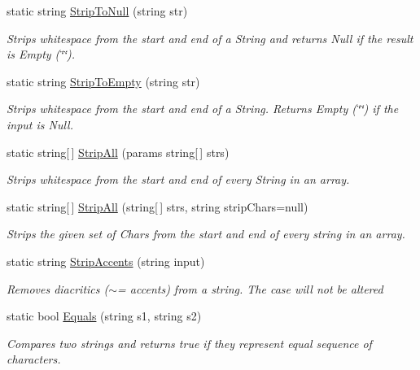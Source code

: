 \begin{DoxyCompactItemize}
static string \hyperlink{class_ultimate_1_1_utilities_1_1_string_utils_a73a525a3fc6b86f8ae1d6fd4c4ffa891}{Strip\+To\+Null} (string str)
\begin{DoxyCompactList}\small\item\em Strips whitespace from the start and end of a String and returns Null if the result is Empty (\char`\"{}\char`\"{}). \end{DoxyCompactList}\item 
static string \hyperlink{class_ultimate_1_1_utilities_1_1_string_utils_ac710f387b0af6a2ca0976705efb8e1b7}{Strip\+To\+Empty} (string str)
\begin{DoxyCompactList}\small\item\em Strips whitespace from the start and end of a String. Returns Empty (\char`\"{}\char`\"{}) if the input is Null. \end{DoxyCompactList}\item 
static string\mbox{[}$\,$\mbox{]} \hyperlink{class_ultimate_1_1_utilities_1_1_string_utils_a5165c2cb4ca636210b9c603ec5249e4d}{Strip\+All} (params string\mbox{[}$\,$\mbox{]} strs)
\begin{DoxyCompactList}\small\item\em Strips whitespace from the start and end of every String in an array. \end{DoxyCompactList}\item 
static string\mbox{[}$\,$\mbox{]} \hyperlink{class_ultimate_1_1_utilities_1_1_string_utils_a8a770c976c5dc46be42cfac9dc353b61}{Strip\+All} (string\mbox{[}$\,$\mbox{]} strs, string strip\+Chars=null)
\begin{DoxyCompactList}\small\item\em Strips the given set of Chars from the start and end of every string in an array. \end{DoxyCompactList}\item 
static string \hyperlink{class_ultimate_1_1_utilities_1_1_string_utils_abb0bead6238c415f7f8fade750aa7648}{Strip\+Accents} (string input)
\begin{DoxyCompactList}\small\item\em Removes diacritics ($\sim$= accents) from a string. The case will not be altered \end{DoxyCompactList}\item 
static bool \hyperlink{class_ultimate_1_1_utilities_1_1_string_utils_a8996e4b64a2e2145ac9574aecce2ce36}{Equals} (string s1, string s2)
\begin{DoxyCompactList}\small\item\em Compares two strings and returns true if they represent equal sequence of characters. \end{DoxyCompactList}\item 

\end{DoxyCompactItemize}

